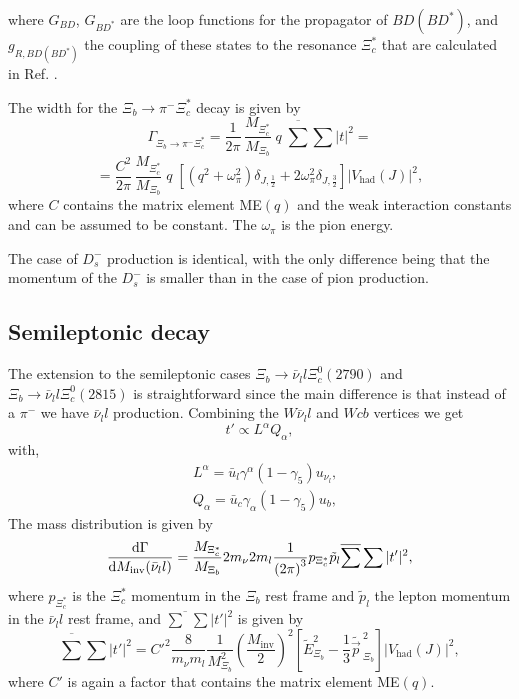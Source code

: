 \documentclass{PoS}
\begin{document}
where $G_{BD}$, $G_{BD^*}$ are the loop functions for the propagator of $BD \left(B D^*\right)$, and $g_{R,BD \left(BD^*\right)}$ the coupling of these states to the resonance $\Xi_c^*$ that are calculated in Ref. \cite{romanets}. 

The width for the $\Xi_b \rightarrow \pi^- \Xi^*_c$ decay is given by
\begin{equation}
\Gamma_{\Xi_b \rightarrow \pi^- \Xi_c^*} = \frac{1}{2 \pi}\, \frac{M_{\Xi_c^*}}{M_{\Xi_b}} \;q \; \overline{\sum} \sum |t|^2=
\end{equation}
\begin{equation}
\label{eq:pionwidth}
= \frac{C^2}{2 \pi}\, \frac{M_{\Xi_c^*}}{M_{\Xi_b}} \;q \; \left[\left(q^2+\omega^2_{\pi} \right)\delta_{J,\frac{1}{2}} + 2\omega^2_{\pi} \delta_{J,\frac{3}{2}}\right] |V_{\text{had}}(J)|^2,
\end{equation}
where $C$ contains the matrix element ME$(q)$ and the weak interaction constants and can be assumed to be constant. The $\omega_{\pi}$ is the pion energy.

The case of $D_s^-$ production is identical, with the only difference being that the momentum of the $D_s^-$ is smaller than in the case of pion production. 

\subsection{Semileptonic decay}
The extension to the semileptonic cases $\Xi_b \rightarrow \bar{\nu}_l l \Xi_c^0(2790)$ and $\Xi_b \rightarrow \bar{\nu}_l l \Xi_c^0(2815)$ is straightforward since the main difference is that instead of a $\pi^-$ we have $\bar{\nu}_l l$ production. Combining the $W \bar{\nu}_l l$ and $W c b$ vertices we get
\begin{equation}
t' \propto L^{\alpha} Q_{\alpha},
\end{equation}
with,
\begin{subequations}
\begin{align}
&  L^{\alpha} = \bar{u}_l \gamma^{\alpha} (1-\gamma_5) u_{\nu_l}, \\
&  Q_{\alpha} = \bar{u}_c \gamma_{\alpha} (1-\gamma_5) u_{b},
\end{align}
\end{subequations}
The mass distribution is given by
\begin{equation}
\label{Eq.:ratiomass}
\frac{{\rm d} \Gamma}{{\rm d}M_{\text{inv}}(\bar{\nu}_l l)}= \frac{M_{\Xi_c^*}}{M_{\Xi_b}} 2 m_{\nu} 2 m_l \frac{1}{\left(2 \pi \right)^3} p_{\Xi_c^*} \tilde{p}_l \overline{\sum}\sum |t'|^2,
\end{equation}
where $p_{\Xi_c^*}$ is the $\Xi_c^*$ momentum in the $\Xi_b$ rest frame and $\tilde{p}_l$ the lepton momentum in the $\bar\nu_l l$ rest frame, and $\overline{\sum}\sum |t'|^2$ is given by \cite{weisemi}
\begin{equation}
\overline{\sum}\sum |t'|^2 = C'^2 \frac{8}{m_{\nu} m_l} \frac{1}{M ^2_{\Xi_b}} \left(\frac{M_{\text{inv}}}{2}\right)^2 \left[\tilde{E}^2_{\Xi_b}-\frac{1}{3} \tilde{\vec{p}\,}^2_ {\Xi_b}\right] |V_{\text{had}}(J)|^2,
\end{equation}
where $C'$ is again a factor that contains the matrix element ME$(q)$.
\end{document}
